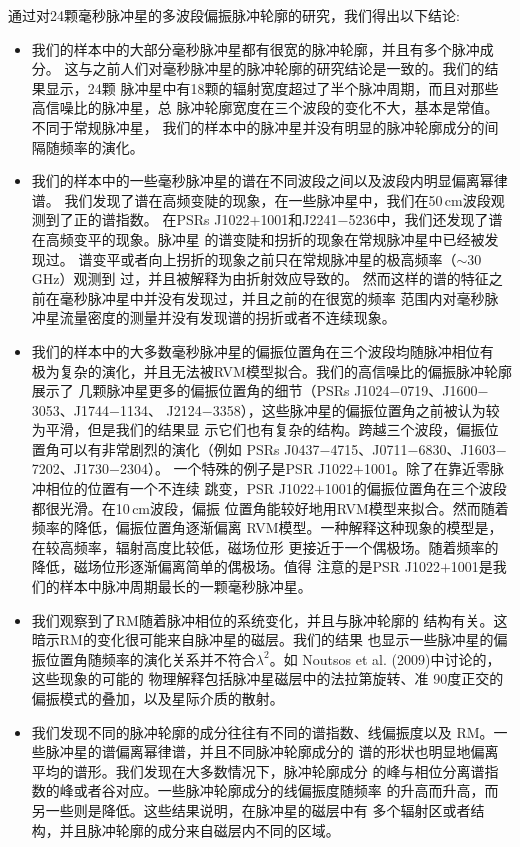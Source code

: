 通过对24颗毫秒脉冲星的多波段偏振脉冲轮廓的研究，我们得出以下结论:
\begin{itemize}
\item 我们的样本中的大部分毫秒脉冲星都有很宽的脉冲轮廓，并且有多个脉冲成分。
这与之前人们对毫秒脉冲星的脉冲轮廓的研究结论是一致的。我们的结果显示，24颗
脉冲星中有18颗的辐射宽度超过了半个脉冲周期，而且对那些高信噪比的脉冲星，总
脉冲轮廓宽度在三个波段的变化不大，基本是常值。不同于常规脉冲星\supercite{Cordes78,Thorsett91,Mitra02,Mitra04,Chen14}，
我们的样本中的脉冲星并没有明显的脉冲轮廓成分的间隔随频率的演化\supercite{Kramer99}。
\item 我们的样本中的一些毫秒脉冲星的谱在不同波段之间以及波段内明显偏离幂律谱。
我们发现了谱在高频变陡的现象，在一些脉冲星中，我们在50\,cm波段观测到了正的谱指数。
在PSRs J1022$+$1001和J2241$-$5236中，我们还发现了谱在高频变平的现象。脉冲星
的谱变陡和拐折的现象在常规脉冲星中已经被发现过\supercite{Maron00,Kijak11}。
谱变平或者向上拐折的现象之前只在常规脉冲星的极高频率（$\sim$30\,GHz）观测到
过\supercite{Kramer96}，并且被解释为由折射效应导致的\supercite{Petrova02}。
然而这样的谱的特征之前在毫秒脉冲星中并没有发现过，并且之前的在很宽的频率
范围内对毫秒脉冲星流量密度的测量并没有发现谱的拐折或者不连续现象\supercite{Kramer99,Kuzmin01}。
\item 我们的样本中的大多数毫秒脉冲星的偏振位置角在三个波段均随脉冲相位有
极为复杂的演化，并且无法被RVM模型拟合。我们的高信噪比的偏振脉冲轮廓展示了
几颗脉冲星更多的偏振位置角的细节（PSRs J1024$-$0719、J1600$-$3053、J1744$-$1134、
J2124$-$3358），这些脉冲星的偏振位置角之前被认为较为平滑，但是我们的结果显
示它们也有复杂的结构。跨越三个波段，偏振位置角可以有非常剧烈的演化（例如
PSRs J0437$-$4715、J0711$-$6830、J1603$-$7202、J1730$-$2304）。
一个特殊的例子是PSR J1022$+$1001。除了在靠近零脉冲相位的位置有一个不连续
跳变，PSR J1022$+$1001的偏振位置角在三个波段都很光滑。在10\,cm波段，偏振
位置角能较好地用RVM模型来拟合。然而随着频率的降低，偏振位置角逐渐偏离
RVM模型。一种解释这种现象的模型是，在较高频率，辐射高度比较低，磁场位形
更接近于一个偶极场。随着频率的降低，磁场位形逐渐偏离简单的偶极场。值得
注意的是PSR J1022$+$1001是我们的样本中脉冲周期最长的一颗毫秒脉冲星。
\item 我们观察到了RM随着脉冲相位的系统变化，并且与脉冲轮廓的
结构有关。这暗示RM的变化很可能来自脉冲星的磁层。我们的结果
也显示一些脉冲星的偏振位置角随频率的演化关系并不符合$\lambda^2$。如
Noutsos et al. (2009)\supercite{Noutsos09}中讨论的，这些现象的可能的
物理解释包括脉冲星磁层中的法拉第旋转\supercite{Kennett98,Wang11}、准
90度正交的偏振模式的叠加\supercite{Ramach04}，以及星际介质的散射\supercite{Kara09}。
\item 我们发现不同的脉冲轮廓的成分往往有不同的谱指数、线偏振度以及
RM。一些脉冲星的谱偏离幂律谱，并且不同脉冲轮廓成分的
谱的形状也明显地偏离平均的谱形。我们发现在大多数情况下，脉冲轮廓成分
的峰与相位分离谱指数的峰或者谷对应。一些脉冲轮廓成分的线偏振度随频率
的升高而升高，而另一些则是降低。这些结果说明，在脉冲星的磁层中有
多个辐射区或者结构，并且脉冲轮廓的成分来自磁层内不同的区域\supercite{Dyks10}。
\end{itemize}

